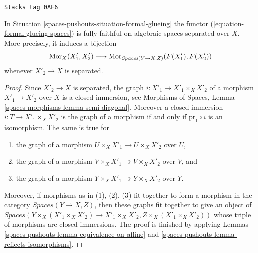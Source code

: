 \begin{lemma}
\label{spaces-pushouts-lemma-fully-faithful-on-separated}
\href{https://stacks.math.columbia.edu/tag/0AF6}{\texttt{Stacks tag 0AF6}}

In Situation \ref{spaces-pushouts-situation-formal-glueing} the functor
(\ref{equation-formal-glueing-spaces}) is fully faithful
on algebraic spaces separated over $X$. More precisely, it induces
a bijection
$$
\operatorname{Mor}_X(X'_1, X'_2)
\longrightarrow
\operatorname{Mor}_{\textit{Spaces}(Y \to X, Z)}(F(X'_1), F(X'_2))
$$
whenever $X'_2 \to X$ is separated.
\end{lemma}

\begin{proof}
Since $X'_2 \to X$ is separated, the graph $i : X'_1 \to X'_1 \times_X X'_2$
of a morphism $X'_1 \to X'_2$ over $X$ is a closed immersion, see
Morphisms of Spaces, Lemma \ref{spaces-morphisms-lemma-semi-diagonal}.
Moreover a closed immersion $i : T \to X'_1 \times_X X'_2$ is the graph of a
morphism if and only if $\text{pr}_1 \circ i$ is an isomorphism.
The same is true for
\begin{enumerate}
\item the graph of a morphism $U \times_X X'_1 \to U \times_X X'_2$ over $U$,
\item the graph of a morphism $V \times_X X'_1 \to V \times_X X'_2$ over $V$,
and
\item the graph of a morphism $Y \times_X X'_1 \to Y \times_X X'_2$ over $Y$.
\end{enumerate}
Moreover, if morphisms as in (1), (2), (3) fit together to form a
morphism in the category $\textit{Spaces}(Y \to X, Z)$, then these
graphs fit together to give an object of
$\textit{Spaces}(Y \times_X (X'_1 \times_X X'_2) \to X'_1 \times_X X'_2,
Z \times_X (X'_1 \times_X X'_2))$
whose triple of morphisms are closed immersions. The proof is finished
by applying Lemmas \ref{spaces-pushouts-lemma-equivalence-on-affine} and
\ref{spaces-pushouts-lemma-reflects-isomorphisms}.
\end{proof}

